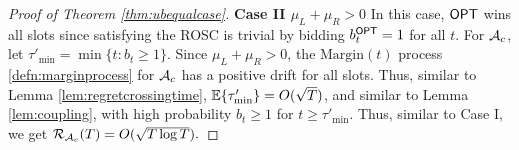 \begin{proof}[Proof of Theorem \ref{thm:ubequalcase}]


{\bf Case II  $\mu_L + \mu_R>0$} 
In this case, $\mathsf{OPT}$ wins all slots since satisfying the ROSC  is trivial by bidding $b_t^{\mathsf{OPT}}=1$ for all $t$.
For $\mathcal{A}_c$, let $\tau'_{\min}= \min\{t: b_t \ge 1\}.$ Since $\mu_L + \mu_R>0$, the $\text{Margin}(t)$ process \eqref{defn:marginprocess} for $\mathcal{A}_c$ has a positive drift for all slots. Thus, similar to Lemma \ref{lem:regretcrossingtime}, ${\mathbb{E}}\{\tau'_{\min}\} = O(\sqrt{T})$, and similar to 
Lemma \ref{lem:coupling}, with high probability $b_t \ge 1$ for $t\ge \tau'_{\min}$. Thus, similar to Case I, we get  $\mathcal{R}_{\mathcal{A}_c}(T) = O(\sqrt{T \log T}).$
\end{proof}


